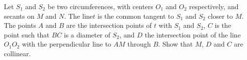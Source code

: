 Let $S_1$ and $S_2$ be two circumferences, with centers $O_1$ and $O_2$ respectively, and secants on $M$ and $N$. The line$t$ is the common tangent to  $S_1$ and $S_2$ closer to $M$. The points $A$ and $B$ are the intersection points of $t$ with $S_1$ and $S_2$,  $C$ is the point such that $BC$ is a diameter of $S_2$,  and $D$ the intersection point of the line $O_1O_2$ with the perpendicular line to $AM$ through $B$. Show that $M$,  $D$ and $C$ are collinear.